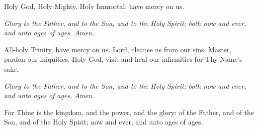 
Holy God, Holy Mighty, Holy Immortal: have mercy on us. \thrice

\vbox{}
\emph{Glory to the Father, and to the Son, and to the Holy Spirit; both now and ever, and
unto ages of ages. Amen.}

\vbox{}
All-holy Trinity, have mercy on us. Lord, cleanse us from our sins. Master, pardon
our iniquities. Holy God, visit and heal our infirmities for Thy Name’s sake.

\vbox{}
\lhmThree

\vbox{}
\emph{Glory to the Father, and to the Son, and to the Holy Spirit; both now and ever, and
unto ages of ages. Amen.}

\vbox{}


\begin{priest}
\item For Thine is the kingdom, and the power, and the glory:
    of the Father, and of the Son, and of the Holy Spirit; now and ever, and unto ages of ages.
\end{priest}